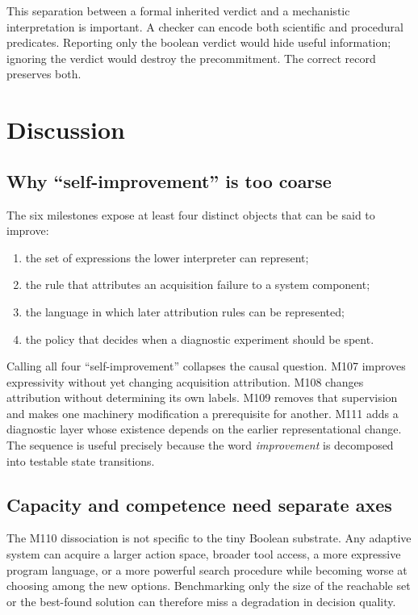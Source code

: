 This separation between a formal inherited verdict and a mechanistic interpretation is important. A checker can encode both scientific and procedural predicates. Reporting only the boolean verdict would hide useful information; ignoring the verdict would destroy the precommitment. The correct record preserves both.

\section{Discussion}
\label{sec:discussion}
\subsection{Why ``self-improvement'' is too coarse}
The six milestones expose at least four distinct objects that can be said to improve:
\begin{enumerate}
  \item the set of expressions the lower interpreter can represent;
  \item the rule that attributes an acquisition failure to a system component;
  \item the language in which later attribution rules can be represented;
  \item the policy that decides when a diagnostic experiment should be spent.
\end{enumerate}
Calling all four ``self-improvement'' collapses the causal question. M107 improves expressivity without yet changing acquisition attribution. M108 changes attribution without determining its own labels. M109 removes that supervision and makes one machinery modification a prerequisite for another. M111 adds a diagnostic layer whose existence depends on the earlier representational change. The sequence is useful precisely because the word \emph{improvement} is decomposed into testable state transitions.

\subsection{Capacity and competence need separate axes}
The M110 dissociation is not specific to the tiny Boolean substrate. Any adaptive system can acquire a larger action space, broader tool access, a more expressive program language, or a more powerful search procedure while becoming worse at choosing among the new options. Benchmarking only the size of the reachable set or the best-found solution can therefore miss a degradation in decision quality.

